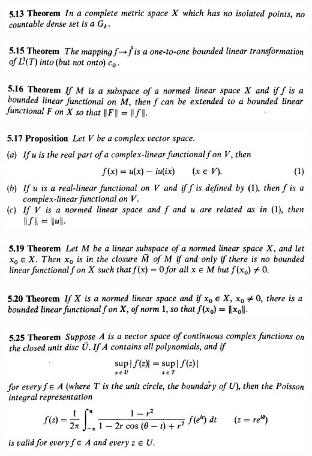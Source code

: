 \documentclass[12pt]{article}
\begin{document}
		\begin{center}
		\includegraphics{5ponto13}
		\end{center}

		\begin{center}
		\includegraphics{5ponto15}
		\end{center}

		\begin{center}
		\includegraphics{5ponto16}
		\end{center}

		\begin{center}
		\includegraphics{5ponto17}
		\end{center}

		\begin{center}
		\includegraphics{5ponto19}
		\end{center}

		\begin{center}
		\includegraphics{5ponto20}
		\end{center}

		\begin{center}
		\includegraphics{5ponto25}
		\end{center}
\end{document}
